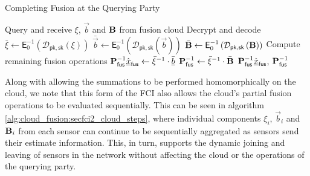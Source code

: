 \begin{algorithm}[htbp]
\caption{Completing Fusion at the Querying Party}\label{alg:cloud_fusion:secfci2_query_steps}
\begin{algorithmic}[1]
    \State Query and receive $\xi$, $\vec{b}$ and ${{\mathbf{B}}}$ from fusion cloud
    \LineComment Decrypt and decode
    \State $\bar{\xi} \gets \mathsf{E}^{-1}_{0}\left(\mathcal{D}_{\mathsf{pk},\mathsf{sk}}\left(\xi\right)\right)$
    \State $\bar{\vec{b}} \gets \mathsf{E}^{-1}_{0}\left(\mathcal{D}_{\mathsf{pk},\mathsf{sk}}\left(\vec{b}\right)\right)$
    \State $\bar{{{\mathbf{B}}}} \gets \mathsf{E}^{-1}_{0}\left(\mathcal{D}_{\mathsf{pk},\mathsf{sk}}\left({{\mathbf{B}}}\right)\right)$
    \LineComment Compute remaining fusion operations
    \State ${{\mathbf{P}}}_{\mathsf{fus}}^{-1}\hat{{\underline{x}}}_{\mathsf{fus}} \gets \bar{\xi}^{-1} \cdot \bar{{\underline{b}}}$
    \State ${{\mathbf{P}}}_{\mathsf{fus}}^{-1} \gets \bar{\xi}^{-1} \cdot \bar{{{\mathbf{B}}}}$
    \State \Return ${{\mathbf{P}}}_{\mathsf{fus}}^{-1}\hat{{\underline{x}}}_{\mathsf{fus}}$, ${{\mathbf{P}}}_{\mathsf{fus}}^{-1}$
    \EndProcedure
\end{algorithmic}
\end{algorithm}

Along with allowing the summations to be performed homomorphically on the cloud, we note that this form of the FCI also allows the cloud's partial fusion operations to be evaluated sequentially. This can be seen in algorithm \ref{alg:cloud_fusion:secfci2_cloud_steps}, where individual components $\xi_i$, $\vec{b}_i$ and ${{\mathbf{B}}}_i$ from each sensor can continue to be sequentially aggregated as sensors send their estimate information. This, in turn, supports the dynamic joining and leaving of sensors in the network without affecting the cloud or the operations of the querying party.

% 
% 

